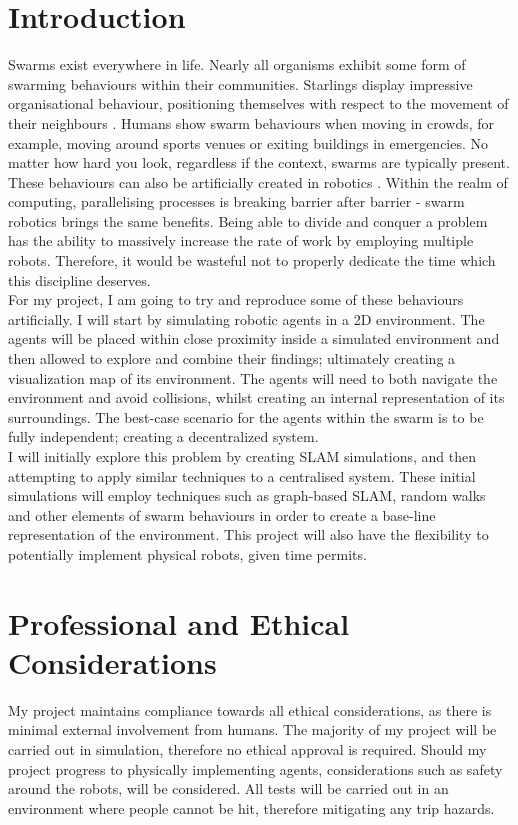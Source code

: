 \documentclass[12pt]{article}
\begin{document}
\section{Introduction}
Swarms exist everywhere in life. Nearly all organisms exhibit some form of swarming behaviours within their
communities. Starlings display impressive organisational behaviour, positioning themselves with respect to the
movement of their neighbours \cite{starling_swarm}. Humans show swarm behaviours when moving in crowds, for example, moving around sports
venues or exiting buildings in emergencies. No matter how hard you look, regardless if the context, swarms are
typically present.\\
These behaviours can also be artificially created in robotics \cite{intro_to_swarm}. Within the realm of computing, parallelising
processes is breaking barrier after barrier - swarm robotics brings the same benefits. Being able to divide and
conquer a problem has the ability to massively increase the rate of work by employing multiple robots. Therefore, it
would be wasteful not to properly dedicate the time which this discipline deserves.\\
For my project, I am going to try and reproduce some of these behaviours artificially. I will start by simulating robotic
agents in a 2D environment. The agents will be placed within close proximity inside a simulated environment and then allowed
to explore and combine their findings; ultimately creating a visualization map of its environment. The agents will need to
both navigate the environment and avoid collisions, whilst creating an internal representation of its surroundings. The
best-case scenario for the agents within the swarm is to be fully independent; creating a decentralized system.\\
I will initially explore this problem by creating SLAM simulations, and then attempting to apply similar techniques
to a centralised system. These initial simulations will employ techniques such as graph-based SLAM, random walks and other elements of
swarm behaviours in order to create a base-line representation of the environment. This project will also have the flexibility to
potentially implement physical robots, given time permits.\\

\section{Professional and Ethical Considerations}
My project maintains compliance towards all ethical considerations, as there is minimal external involvement from
humans. The majority of my project will be carried out in simulation, therefore no ethical approval is required. Should
my project progress to physically implementing agents, considerations such as safety around the robots, will be considered.
All tests will be carried out in an environment where people cannot be hit, therefore mitigating any trip hazards.\\
\end{document}
